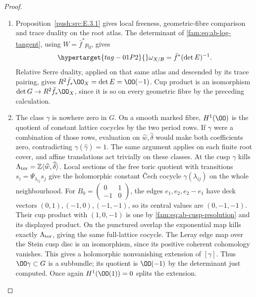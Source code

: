 \begin{proof}
\begin{enumerate}[label=\arabic*.,leftmargin=*]
\item Proposition~\ref{push:src:E.3.1} gives local freeness,
geometric-fibre comparison and trace duality on the root atlas.
The determinant of \eqref{fam:eq:ab-log-tangent}, using $W=\bar f^*p_0$, gives
\begin{equation}
 \hypertarget{tag-01P2}{}\label{fam:eq:ab-relative-dualizing}
\omega_{X/\mathcal B}=\bar f^*(\det E)^{-1}.
\end{equation}
Relative Serre duality, applied on that same atlas and descended by
its trace pairing, gives $R^2\bar f_*\OO_X=\det E=\OO(-1)$.
Cup product is an isomorphism $\det G\to R^2\bar f_*\OO_X$, since it
is so on every geometric fibre by the preceding calculation.

\item The class $\gamma$ is nowhere zero in $G$. On a smooth marked fibre,
$H^1(\OO)$ is the quotient of constant lattice cocycles by the two
period rows. If $\gamma$ were a combination of those rows, evaluation
on $\widehat w,\widehat\delta$ would make both coefficients zero,
contradicting $\gamma(\widehat\gamma)=1$. The same argument applies
on each finite root cover, and affine translations act trivially on
these classes. At the cusp $\gamma$ kills
$\Lambda_{\rm tor}=\mathbb Z\langle\widehat w,\widehat\delta\rangle$.
Local sections of the free toric quotient with transitions
$s_i=\Psi_{\lambda_{ij}}s_j$ give the holomorphic constant \v Cech
cocycle $\gamma(\lambda_{ij})$ on the whole neighbourhood.
For $B_0=\left(\begin{smallmatrix}0&1\\-1&0\end{smallmatrix}\right)$,
the edges $e_1,e_2,e_2-e_1$ have deck vectors
$(0,1),(-1,0),(-1,-1)$, so its central values are $(0,-1,-1)$.
Their cup product with $(1,0,-1)$ is one by
\eqref{fam:eq:ab-cusp-resolution} and its displayed product.
On the punctured overlap the exponential map kills exactly
$\Lambda_{\rm tor}$, giving the same full-lattice cocycle.
The Leray edge map over the Stein cusp disc is an isomorphism,
since its positive coherent cohomology vanishes. This gives
a holomorphic nonvanishing extension of $[\gamma]$.
Thus
$\OO\gamma\subset G$ is a subbundle; its quotient is $\OO(-1)$ by
the determinant just computed. Once again $H^1(\OO(1))=0$ splits the
extension.
\end{enumerate}
\end{proof}